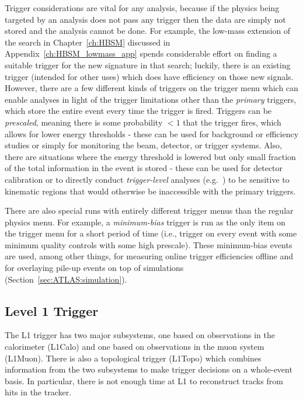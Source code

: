 Trigger considerations are vital for any analysis, because if the physics being targeted by an analysis does not pass any trigger then the data are simply not stored and the analysis cannot be done.
For example, the low-mass extension of the search in Chapter~\ref{ch:HBSM} discussed in Appendix~\ref{ch:HBSM_lowmass_app} spends considerable effort on finding a suitable trigger for the new signature in that search; luckily, there is an existing trigger (intended for other uses) which does have efficiency on those new signals.
However, there are a few different kinds of triggers on the trigger menu which can enable analyses in light of the trigger limitations other than the \textit{primary} triggers, which store the entire event every time the trigger is fired.
Triggers can be \textit{prescaled}, meaning there is some probability $<1$ that the trigger fires, which allows for lower energy thresholds - these can be used for background or efficiency studies or simply for monitoring the beam, detector, or trigger systems.
Also, there are situations where the energy threshold is lowered but only small fraction of the total information in the event is stored - these can be used for detector calibration or to directly conduct \textit{trigger-level} analyses (e.g.~\cite{Aaboud:2018fzt}) to be sensitive to kinematic regions that would otherwise be inaccessible with the primary triggers.

There are also special runs with entirely different trigger menus than the regular physics menu.
For example, a \textit{minimum-bias} trigger is run as the only item on the trigger menu for a short period of time (i.e., trigger on every event with some minimum quality controls with some high prescale).
These minimum-bias events are used, among other things, for measuring online trigger efficiencies offline and for overlaying pile-up events on top of simulations (Section~\ref{sec:ATLAS:simulation}).

\subsection{Level 1 Trigger}
\label{sec:ATLAS:L1}

The L1 trigger has two major subsystems, one based on observations in the calorimeter (L1Calo) and one based on observations in the muon system (L1Muon).
There is also a topological trigger (L1Topo) which combines information from the two subsystems to make trigger decisions on a whole-event basis.
In particular, there is not enough time at L1 to reconstruct tracks from hits in the tracker.

